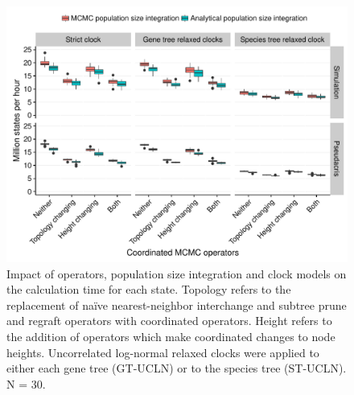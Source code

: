 \documentclass[12pt]{article}
\begin{document}
\clearpage

\begin{figure}[htb!]
\centering
\includegraphics[width=130mm]{mstates_per_hour.pdf}
\caption
{Impact of operators, population size integration and clock models on
the calculation time for each state. Topology refers to the
replacement of na\"ive nearest-neighbor interchange and subtree prune and
regraft operators with coordinated operators. Height refers to the addition of
operators which make coordinated changes to node heights. Uncorrelated
log-normal relaxed clocks were applied to either each gene tree (GT-UCLN) or to
the species tree (ST-UCLN). N = 30.}
\label{fig:mstatesPerHour}
\end{figure}

\clearpage
\end{document}
